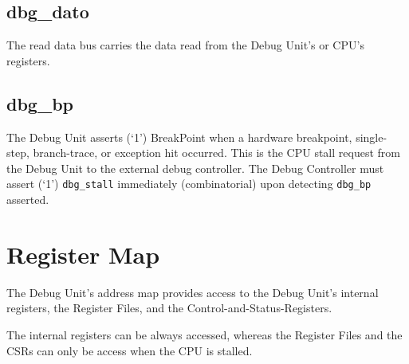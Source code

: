 \subsection{dbg\_dato}\label{dbg_dato}

The read data bus carries the data read from the Debug Unit's or CPU's
registers.

\subsection{dbg\_bp}\label{dbg_bp}

The Debug Unit asserts (`1') BreakPoint when a hardware breakpoint,
single-step, branch-trace, or exception hit occurred. This is the CPU
stall request from the Debug Unit to the external debug controller. The
Debug Controller must assert (`1') \texttt{dbg\_stall} immediately
(combinatorial) upon detecting \texttt{dbg\_bp} asserted.

\section{Register Map}\label{register-map}

The Debug Unit's address map provides access to the Debug Unit's
internal registers, the Register Files, and the
Control-and-Status-Registers.

The internal registers can be always accessed, whereas the Register
Files and the CSRs can only be access when the CPU is stalled.

